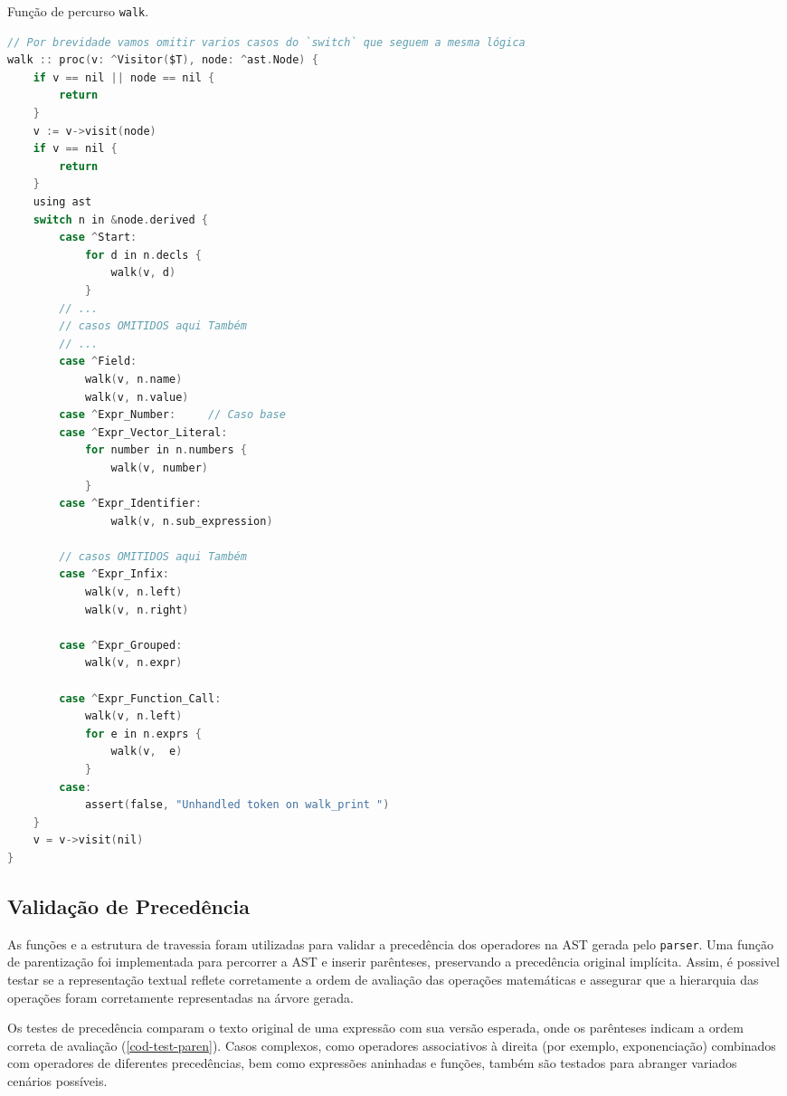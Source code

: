 \begin{codigo}[htb]
\caption{\small Função de percurso \texttt{walk}. }
        \label{cod-visitor-walk}
\begin{lstlisting}[language = C, basicstyle=\ttfamily\footnotesize]
// Por brevidade vamos omitir varios casos do `switch` que seguem a mesma lógica
walk :: proc(v: ^Visitor($T), node: ^ast.Node) {
    if v == nil || node == nil {
        return
    }
    v := v->visit(node)
    if v == nil {
        return
    }
    using ast
    switch n in &node.derived {
        case ^Start:
            for d in n.decls {
                walk(v, d)
            }
        // ...
        // casos OMITIDOS aqui Também
        // ...
        case ^Field:
            walk(v, n.name)
            walk(v, n.value)
        case ^Expr_Number:     // Caso base
        case ^Expr_Vector_Literal:
            for number in n.numbers {
                walk(v, number)
            }
        case ^Expr_Identifier:
                walk(v, n.sub_expression)

        // casos OMITIDOS aqui Também
        case ^Expr_Infix:
            walk(v, n.left)
            walk(v, n.right)

        case ^Expr_Grouped:
            walk(v, n.expr)

        case ^Expr_Function_Call:
            walk(v, n.left)
            for e in n.exprs {
                walk(v,  e)
            }
        case:
            assert(false, "Unhandled token on walk_print ")
    }
    v = v->visit(nil)
}

  \end{lstlisting}
\end{codigo}


\subsection{Validação de Precedência}
As funções e a estrutura de travessia foram utilizadas para validar a precedência dos operadores na AST gerada pelo \texttt{parser}. Uma função de parentização foi implementada para percorrer a AST e inserir parênteses, preservando a precedência original implícita. Assim, é possivel testar se a representação textual reflete corretamente a ordem de avaliação das operações matemáticas e assegurar que a hierarquia das operações foram corretamente representadas na árvore gerada.

Os testes de precedência comparam o texto original de uma expressão com sua versão esperada, onde os parênteses indicam a ordem correta de avaliação (\autoref{cod-test-paren}). Casos complexos, como operadores associativos à direita (por exemplo, exponenciação) combinados com operadores de diferentes precedências, bem como expressões aninhadas e funções, também são testados para abranger variados cenários possíveis.


